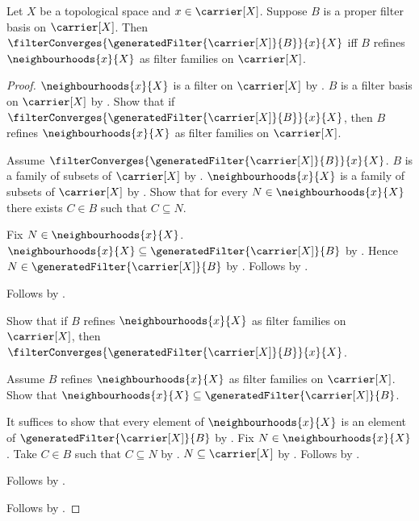 \begin{theorem}\label{generated_filter_converges_iff_refines_neighbourhoods}
    Let $X$ be a topological space and $x\in\carrier[X]$.
    Suppose $B$ is a proper filter basis on $\carrier[X]$.
    Then $\filterConverges{\generatedFilter{\carrier[X]}{B}}{x}{X}$ iff
        $B$ refines $\neighbourhoods{x}{X}$
            as filter families on $\carrier[X]$.
\end{theorem}
\begin{proof}
    $\neighbourhoods{x}{X}$ is a filter on $\carrier[X]$
        by .
    $B$ is a filter basis on $\carrier[X]$ by
        .
    Show that if
        $\filterConverges{\generatedFilter{\carrier[X]}{B}}{x}{X}$, then
        $B$ refines $\neighbourhoods{x}{X}$
            as filter families on $\carrier[X]$.
    \begin{subproof}
        Assume $\filterConverges{\generatedFilter{\carrier[X]}{B}}{x}{X}$.
        $B$ is a family of subsets of $\carrier[X]$
            by .
        $\neighbourhoods{x}{X}$ is a family of subsets of $\carrier[X]$
            by .
        Show that for every $N\in\neighbourhoods{x}{X}$ there exists
            $C\in B$ such that $C\subseteq N$.
        \begin{subproof}
            Fix $N\in\neighbourhoods{x}{X}$.
            $\neighbourhoods{x}{X}
                \subseteq\generatedFilter{\carrier[X]}{B}$
                by .
            Hence $N\in\generatedFilter{\carrier[X]}{B}$ by .
            Follows by .
        \end{subproof}
        Follows by .
    \end{subproof}

    Show that if $B$ refines $\neighbourhoods{x}{X}$
        as filter families on $\carrier[X]$, then
        $\filterConverges{\generatedFilter{\carrier[X]}{B}}{x}{X}$.
    \begin{subproof}
        Assume $B$ refines $\neighbourhoods{x}{X}$
            as filter families on $\carrier[X]$.
        Show that $\neighbourhoods{x}{X}
            \subseteq\generatedFilter{\carrier[X]}{B}$.
        \begin{subproof}
            It suffices to show that every element of
                $\neighbourhoods{x}{X}$ is an element of
                $\generatedFilter{\carrier[X]}{B}$ by .
            Fix $N\in\neighbourhoods{x}{X}$.
            Take $C\in B$ such that $C\subseteq N$
                by .
            $N\subseteq\carrier[X]$ by .
            Follows by .
        \end{subproof}
        Follows by .
    \end{subproof}
    Follows by \auto.
\end{proof}
